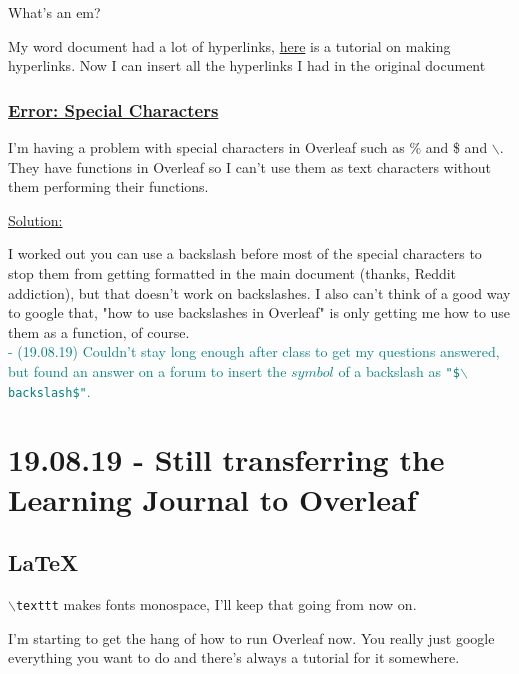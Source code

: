 \documentclass[12pt]{article}
\begin{document}
What's an em? 

\color{black}
My word document had a lot of hyperlinks, 
\href{https://www.overleaf.com/learn/latex/Hyperlinks}{here} is a tutorial on making hyperlinks. Now I can insert all the hyperlinks I had in the original document

\subsubsection{\texorpdfstring{\underline{Error: Special Characters}}{}}\label{error:er7}
\begin{addmargin}[1cm]{0cm}
I'm having a problem with special characters in Overleaf such as \% and \$ and $\backslash$. They have functions in Overleaf so I can't use them as text characters without them performing their functions.

\underline{Solution:}

I worked out you can use a backslash before most of the special characters to stop them from getting formatted in the main document (thanks, Reddit addiction), but that doesn't work on backslashes. I also can't think of a good way to google that, "how to use backslashes in Overleaf" is only getting me how to use them as a function, of course.
\\\textcolor{teal}{- (19.08.19) Couldn't stay long enough after class to get my questions answered, but found an answer on a forum to insert the $symbol$ of a backslash as \texttt{"\$$\backslash$backslash\$"}.}
\end{addmargin}

\section{19.08.19 - Still transferring the Learning Journal to Overleaf}
\subsection{LaTeX}

\texttt{$\backslash$texttt} makes fonts monospace, I'll keep that going from now on.

I'm starting to get the hang of how to run Overleaf now. You really just google everything you want to do and there's always a tutorial for it somewhere. 
\end{document}
